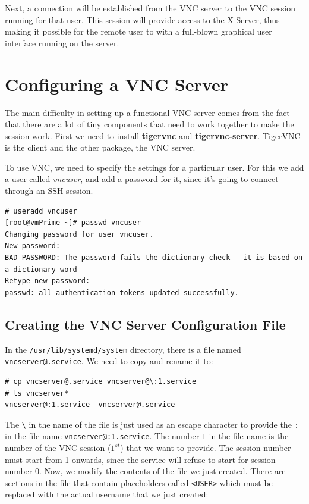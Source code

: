 Next, a connection will be established from the VNC server to the VNC session running for that user. This session will provide access to the X-Server, thus making it possible for the remote user to with a full-blown graphical user interface running on the server. 

\section{Configuring a VNC Server}
The main difficulty in setting up a functional VNC server comes from the fact that there are a lot of tiny components that need to work together to make the session work. First we need to install \textbf{tigervnc} and \textbf{tigervnc-server}. TigerVNC is the client and the other package, the VNC server. 

To use VNC, we need to specify the settings for a particular user. For this we add a user called \textit{vncuser}, and add a password for it, since it's  going to connect through an SSH session. 

\vspace{-15pt}
\begin{verbatim}
# useradd vncuser
[root@vmPrime ~]# passwd vncuser
Changing password for user vncuser.
New password: 
BAD PASSWORD: The password fails the dictionary check - it is based on a dictionary word
Retype new password: 
passwd: all authentication tokens updated successfully.
\end{verbatim}
\vspace{-10pt}

\subsection{Creating the VNC Server Configuration File}
In the \verb|/usr/lib/systemd/system| directory, there is a file named \verb|vncserver@.service|. We need to copy and rename it to:

\vspace{-15pt}
\begin{verbatim}
# cp vncserver@.service vncserver@\:1.service
# ls vncserver*
vncserver@:1.service  vncserver@.service
\end{verbatim}
\vspace{-10pt}

\noindent
The \verb|\| in the name of the file is just used as an escape character to provide the \verb|:| in the file name \verb|vncserver@:1.service|. The number $1$ in the file name is the number of the VNC session ($1^{st}$) that we want to provide. The session number must start from 1 onwards, since the service will refuse to start for session number 0. Now, we modify the contents of the file we just created. There are sections in the file that contain placeholders called \verb|<USER>| which must be replaced with the actual username that we just created:

